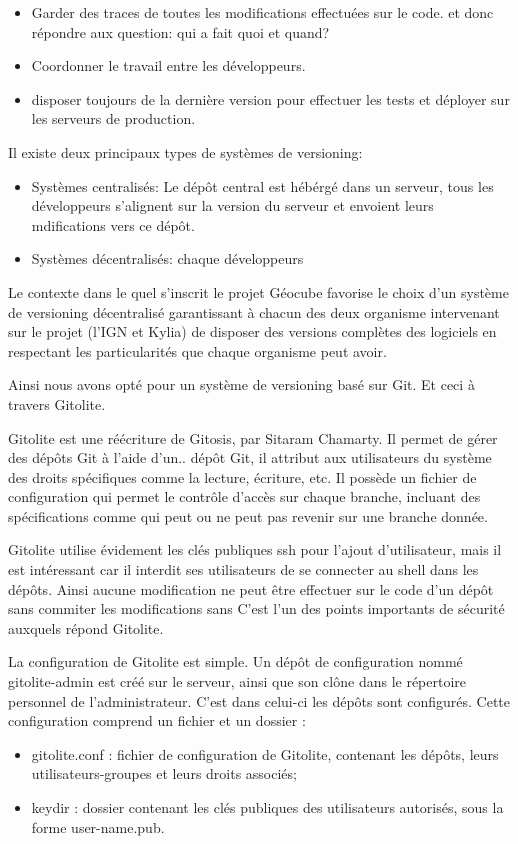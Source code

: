 \documentclass{themeensg}
\begin{document}
\begin{itemize}
\item Garder des traces de toutes les modifications effectuées sur le code. et donc répondre aux question: qui a fait quoi et quand?
\item Coordonner le travail entre les développeurs.
\item disposer toujours de la dernière version pour effectuer les tests et déployer sur les serveurs de production.
\end{itemize}

Il existe deux principaux types de systèmes de versioning:
\begin{itemize}
\item Systèmes centralisés: Le dépôt central est hébérgé dans un serveur, tous les développeurs s'alignent sur la version du serveur et envoient leurs mdifications vers ce dépôt.
\item Systèmes décentralisés: chaque développeurs
\end{itemize}

Le contexte dans le quel s'inscrit le projet Géocube favorise le choix d'un système de versioning décentralisé garantissant à chacun des deux organisme intervenant sur le projet (l'IGN et Kylia) de disposer des versions complètes des logiciels en respectant les particularités que chaque organisme peut avoir.

Ainsi nous avons opté pour un système de versioning basé sur Git. Et ceci à travers Gitolite.

Gitolite est une réécriture de Gitosis, par Sitaram Chamarty. Il permet de gérer des dépôts Git à l'aide d'un.. dépôt Git, il attribut aux utilisateurs du système des droits spécifiques comme la lecture, écriture, etc. Il possède un fichier de configuration qui permet le contrôle d'accès sur chaque branche, incluant des spécifications comme qui peut ou ne peut pas revenir sur une branche donnée.

Gitolite utilise évidement les clés publiques ssh pour l'ajout d'utilisateur, mais il est intéressant car il interdit ses utilisateurs de se connecter au shell dans les dépôts. Ainsi aucune modification ne peut être effectuer sur le code d'un dépôt sans commiter les modifications sans C'est l'un des points importants de sécurité auxquels répond Gitolite.

 La configuration de Gitolite est simple. Un dépôt de configuration nommé gitolite-admin est créé sur le serveur, ainsi que son clône dans le répertoire personnel de l'administrateur. C'est dans celui-ci les dépôts sont configurés. Cette configuration comprend un fichier et un dossier :
\begin{itemize}
\item gitolite.conf : fichier de configuration de Gitolite, contenant les dépôts, leurs utilisateurs-groupes et leurs droits associés;
\item keydir : dossier contenant les clés publiques des utilisateurs autorisés, sous la forme user-name.pub.
\end{itemize}
\end{document}
